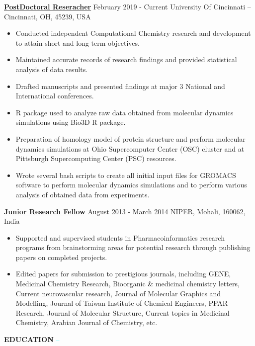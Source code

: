 \documentclass{article}
\newcommand\liner{\leavevmode\xleaders\hbox{\textcolor{cyan}{--}}\hfill\kern0pt}
\begin{document}
\normalsize{
\textbf{\underline{PostDoctoral Reseracher}} \hfill February 2019 - Current
\flushright University Of Cincinnati – Cincinnati, OH, 45239, USA
\begin{itemize}
\item Conducted independent Computational Chemistry research and development to attain short and long-term objectives.
\item Maintained accurate records of research findings and provided statistical analysis of data results.
\item Drafted manuscripts and presented findings at major 3 National and International conferences.
\item R package used to analyze raw data obtained from molecular dynamics simulations using Bio3D R package.
\item Preparation of homology model of protein structure and perform molecular dynamics simulations at Ohio Supercomputer Center (OSC) cluster and at Pittsburgh Supercomputing Center (PSC) resources.
\item Wrote several bash scripts to create all initial input files for GROMACS software to perform molecular dynamics simulations and to perform various analysis of obtained data from experiments.
\end{itemize}}
\normalsize{
\textbf{\underline{Junior Research Fellow}} \hfill August 2013 - March 2014
\flushright NIPER, Mohali, 160062, India
\begin{itemize}
\item Supported and supervised students in Pharmacoinformatics research programs from brainstorming areas for potential research through publishing papers on completed projects.
\item Edited papers for submission to prestigious journals, including GENE, Medicinal Chemistry Research, Bioorganic \& medicinal chemistry letters, Current neurovascular research, Journal of Molecular Graphics and Modelling, Journal of Taiwan Institute of Chemical Engineers, PPAR Research, Journal of Molecular Structure, Current topics in Medicinal Chemistry, Arabian Journal of Chemistry, etc.
\end{itemize}}


\large{\textcolor{brey}{\textbf{EDUCATION}}} \liner
\vspace{10pt}
\end{document}
